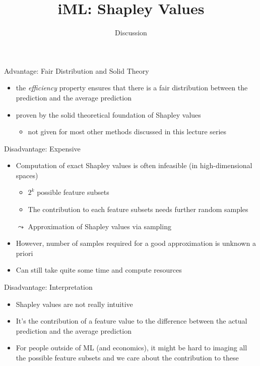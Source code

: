 \documentclass[aspectratio=169]{../latex_main/tntbeamer}  %
\title[Introduction]{iML: Shapley Values}
\subtitle{Discussion}
\begin{document}
	
	\maketitle
	
\begin{frame}{Advantage: Fair Distribution and Solid Theory}
    
    \begin{itemize}
        \item the \emph{efficiency} property ensures that there is a fair distribution between the prediction and the average prediction 
        \item proven by the solid theoretical foundation of Shapley values 
        \begin{itemize}
            \item not given for most other methods discussed in this lecture series
        \end{itemize}
    \end{itemize}
    
\end{frame}

	
\begin{frame}{Disadvantage: Expensive}
    
    \begin{itemize}
        \item Computation of exact Shapley values is often infeasible (in high-dimensional spaces)
        \begin{itemize}
            \item $2^k$ possible feature subsets
            \item The contribution to each feature subsets needs further random samples
        \end{itemize}
        \pause
        \bigskip
        \item[$\leadsto$] Approximation of Shapley values via sampling
        \item However, number of samples required for a good approximation is unknown a priori
        \item Can still take quite some time and compute resources
    \end{itemize}
    
\end{frame}

\begin{frame}{Disadvantage: Interpretation}
    
    \begin{itemize}
        \item Shapley values are not really intuitive
        \item It's the contribution of a feature value to the difference between the actual prediction and the average prediction
        \item For people outside of ML (and economics), it might be hard to imaging all the possible feature subsets and we care about the contribution to these
    \end{itemize}
    
\end{frame}
\end{document}
